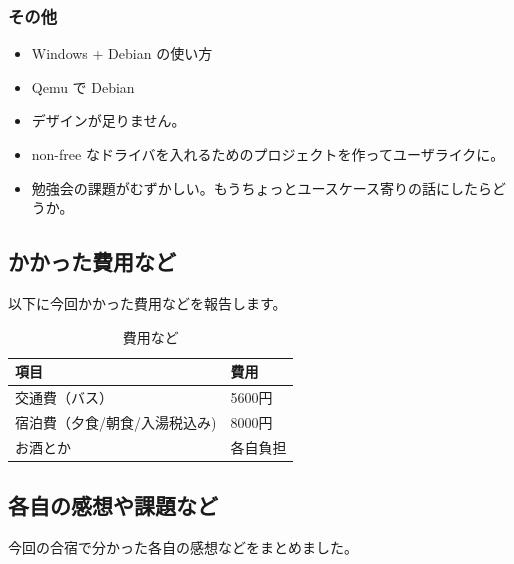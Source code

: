 \documentclass[mingoth,a4paper]{jsarticle}
\begin{document}
\subsubsection{その他}
\begin{itemize}
 \item Windows  + Debian の使い方
 \item Qemu で Debian
 \item デザインが足りません。
 \item non-free なドライバを入れるためのプロジェクトを作ってユーザライクに。
 \item 勉強会の課題がむずかしい。もうちょっとユースケース寄りの話にしたらどうか。
\end{itemize}	

\subsection{かかった費用など}
以下に今回かかった費用などを報告します。

\begin{table}[h]
 \begin{center}
 {
   \begin{tabular}{l|l} \hline
     項目 & 費用  \\ \hline \hline
     交通費（バス） & 5600円 \\
     宿泊費（夕食/朝食/入湯税込み) & 8000円 \\
     お酒とか & 各自負担 \\
   \end{tabular}
 }
 \caption{費用など}
 \label{onsen-cost}
 \end{center}
\end{table}


\subsection{各自の感想や課題など}

今回の合宿で分かった各自の感想などをまとめました。
\end{document}
